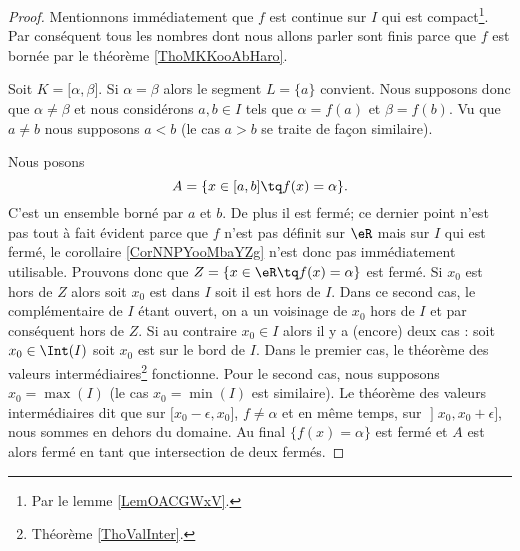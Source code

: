 \begin{proof}
    Mentionnons immédiatement que \( f\) est continue sur \( I\) qui est compact\footnote{Par le lemme \ref{LemOACGWxV}.}. Par conséquent tous les nombres dont nous allons parler sont finis parce que \( f\) est bornée par le théorème \ref{ThoMKKooAbHaro}.

    Soit \( K=\mathopen[ \alpha , \beta \mathclose]\). Si \( \alpha=\beta\) alors le segment \( L=\{ a \}\) convient. Nous supposons donc que \( \alpha\neq \beta\) et nous considérons \( a,b\in I\) tels que \( \alpha=f(a)\) et \( \beta=f(b)\). Vu que \( a\neq b\) nous supposons \( a<b\) (le cas \( a>b\) se traite de façon similaire).

    Nous posons
    \begin{equation}
        A=\{ x\in\mathopen[ a , b \mathclose]\tq f(x)=\alpha \}.
    \end{equation}
    C'est un ensemble borné par \( a\) et \( b\). De plus il est fermé; ce dernier point n'est pas tout à fait évident parce que \( f\) n'est pas définit sur \( \eR\) mais sur \( I\) qui est fermé, le corollaire \ref{CorNNPYooMbaYZg} n'est donc pas immédiatement utilisable. Prouvons donc que \( Z=\{ x\in \eR\tq f(x)=\alpha \}\) est fermé. Si \( x_0\) est hors de \( Z\) alors soit \( x_0\) est dans \( I\) soit il est hors de \( I\). Dans ce second cas, le complémentaire de \( I\) étant ouvert, on a un voisinage de \( x_0\) hors de \( I\) et par conséquent hors de \( Z\). Si au contraire \( x_0\in I\) alors il y a (encore) deux cas : soit \( x_0\in\Int(I)\) soit \( x_0\) est sur le bord de \( I\). Dans le premier cas, le théorème des valeurs intermédiaires\footnote{Théorème \ref{ThoValInter}.} fonctionne. Pour le second cas, nous supposons \( x_0=\max(I)\) (le cas \( x_0=\min(I)\) est similaire). Le théorème des valeurs intermédiaires dit que sur \( \mathopen[ x_0-\epsilon , x_0 \mathclose]\), \( f\neq \alpha\) et en même temps, sur \( \mathopen] x_0 , x_0+\epsilon \mathclose]\), nous sommes en dehors du domaine. Au final \( \{ f(x)=\alpha \}\) est fermé et \( A\) est alors fermé en tant que intersection de deux fermés.


\end{proof}
